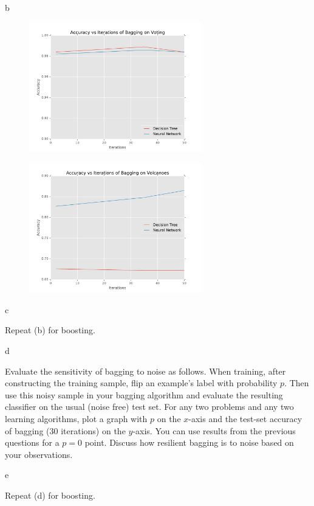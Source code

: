 \documentclass[fleqn]{homework}
\begin{document}
\begin{problem}{b}
    \begin{figure}[h!]
      \centering
      \caption{}
      \label{f:b-voting}
      \includegraphics[width=0.67\textwidth]{b-voting.pdf}
    \end{figure}
    \begin{figure}[h!]
      \centering
      \caption{}
      \label{f:b-volcanoes}
      \includegraphics[width=0.67\textwidth]{b-volcanoes.pdf}
    \end{figure}
  \end{problem}

  \begin{problem}{c}
    \begin{question}
      Repeat (b) for boosting.
    \end{question}
  \end{problem}

  \begin{problem}{d}
    \begin{question}
      Evaluate the sensitivity of bagging to noise as follows. When training,
      after constructing the training sample, flip an example’s label with
      probability $p$. Then use this noisy sample in your bagging algorithm and
      evaluate the resulting classifier on the usual (noise free) test set. For
      any two problems and any two learning algorithms, plot a graph with $p$ on
      the $x$-axis and the test-set accuracy of bagging (30 iterations) on the
      $y$-axis. You can use results from the previous questions for a $p=0$
      point. Discuss how resilient bagging is to noise based on your
      observations.
    \end{question}
  \end{problem}

  \begin{problem}{e}
    \begin{question}
      Repeat (d) for boosting.
    \end{question}
  \end{problem}
\end{document}
